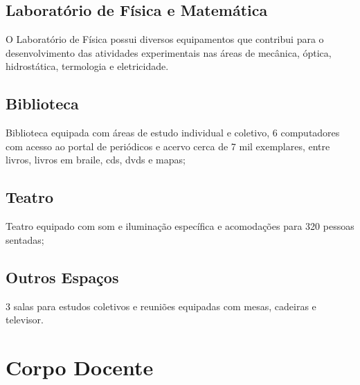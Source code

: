 \documentclass[11pt,fleqn]{book} %
\begin{document}
\section{Laboratório de Física e Matemática}
O Laboratório de Física possui diversos equipamentos que contribui para o desenvolvimento das atividades experimentais nas áreas de mecânica, óptica, hidrostática, termologia e eletricidade.

\section{Biblioteca}
Biblioteca equipada com áreas de estudo individual e coletivo, 6 computadores com acesso ao portal de periódicos e acervo cerca de 7 mil exemplares, entre livros, livros em braile, cds, dvds e mapas;

\section{Teatro}
Teatro equipado com som e iluminação específica e acomodações para 320 pessoas sentadas;

\section{Outros Espaços}
3 salas para estudos coletivos e reuniões equipadas com mesas, cadeiras e televisor.


\chapter{Corpo Docente}
\vspace{12em}
\end{document}
